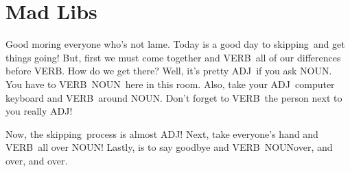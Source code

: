 \documentclass[]{article}
\newcommand{\verbOne}{skipping}
\newcommand{\verbTwo}{VERB}
\newcommand{\verbThree}{VERB}
\newcommand{\verbFour}{VERB}
\newcommand{\verbFive}{VERB}
\newcommand{\verbSix}{VERB}
\newcommand{\nounTwo}{NOUN}
\newcommand{\nounThree}{NOUN}
\newcommand{\nounFour}{NOUN}
\newcommand{\nounFive}{NOUN}
\newcommand{\adjOne}{lame}
\newcommand{\adjTwo}{ADJ}
\newcommand{\adjThree}{ADJ}
\newcommand{\adjFive}{ADJ}
\begin{document}
\section{Mad Libs}

Good moring everyone who's not \adjOne.
Today is a good day to \verbOne~and get things going!
But, first we must come together and \verbTwo~all of our differences before \verbThree.
How do we get there?
Well, it's pretty \adjTwo~if you ask \nounTwo.
You have to \verbFour~\nounTwo~here in this room.
Also, take your \adjFive~computer keyboard and \verbFive~around \nounThree.
Don't forget to \verbFour~the person next to you really \adjThree!

Now, the \verbOne~process is almost \adjTwo!
Next, take everyone's hand and \verbSix~all over \nounFour!
Lastly, is to say goodbye and \verbThree~\nounFive over, and over, and over.
\end{document}
